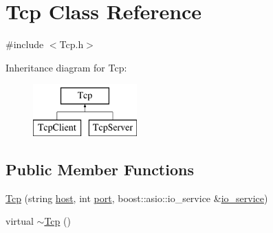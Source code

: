 \hypertarget{classTcp}{
\section{Tcp Class Reference}
\label{classTcp}
}


{\ttfamily \#include $<$Tcp.h$>$}

Inheritance diagram for Tcp:\begin{figure}[H]
\begin{center}
\leavevmode
\includegraphics[height=2.000000cm]{classTcp}
\end{center}
\end{figure}
\subsection*{Public Member Functions}
\begin{DoxyCompactItemize}
\item 
\hyperlink{classTcp_af081afa2fd34edc12ac0dda43851352c}{Tcp} (string \hyperlink{classTcp_a0e981d15f94a460b91845bce9b930c61}{host}, int \hyperlink{classTcp_a7ed15f78afc9d0675404b4b41cc723ba}{port}, boost::asio::io\_\-service \&\hyperlink{classTcp_ad0c319a0974aa3f07e9c5ae290ea18b4}{io\_\-service})
\item 
virtual \hyperlink{classTcp_ab5d2bbefce3133529f51b2afa2796b90}{$\sim$Tcp} ()
\end{DoxyCompactItemize}
